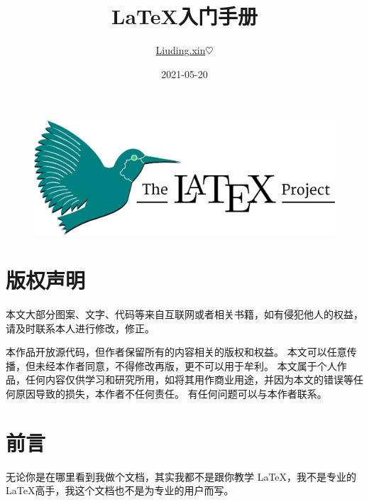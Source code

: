 \documentclass[UTF8,AutoFakeBold]{ctexart}
\numberwithin{figure}{section}
\numberwithin{table}{section}
\begin{document}
\title{ \LaTeX 入门手册}
\author{ \href{http://www.liuding.xin}{Liuding.xin}$\heartsuit$}
\date{2021-05-20}


\begin{titlepage}
    \maketitle %
    \begin{figure}[htbp]
        \centering
        \includegraphics[center, scale=0.5, angle=-50]{images/1200px_LaTeX_project_logo_bird.svg.png}
    \end{figure}
\end{titlepage}

\section*{版权声明}

本文大部分图案、文字、代码等来自互联网或者相关书籍，如有侵犯他人的权益，请及时联系本人进行修改，修正。

本作品开放源代码，但作者保留所有的内容相关的版权和权益。 本文可以任意传播，但未经本作者同意，不得修改再版，更不可以用于牟利。 本文属于个人作品，任何内容仅供学习和研究所用，如将其用作商业用途，并因为本文的错误等任何原因导致的损失，本作者不任何责任。 有任何问题可以与本作者联系。
\clearpage

\tableofcontents

\listoffigures

\listoftables


\clearpage

\section*{前言}

无论你是在哪里看到我做个文档，其实我都不是跟你教学 \LaTeX ，我不是专业的 \LaTeX 高手，我这个文档也不是为专业的用户而写。
\end{document}
